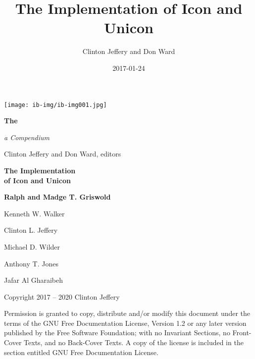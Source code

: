 \documentclass[letterpaper,twoside,12pt]{book}
\title{The Implementation of Icon and Unicon}
\author{Clinton Jeffery and Don Ward}
\date{2017-01-24}
\newcommand*{\TitleFont}{%
      \usefont{T1}{ptm}{b}{n}%
      \fontsize{50}{56}%
      \selectfont}
\begin{document}
\clearpage\clearpage\setcounter{page}{1}\pagestyle{KonvertFolgeii}
\thispagestyle{Konverti}
\begin{center}
\texttt{[image: ib-img/ib-img001.jpg]}
\end{center}
{\color{black}
\bfseries\Huge
The \vspace{0.05in}

\noindent \TitleFont
\begin{center}
\colorbox{blue}{\makebox[6.2in][r]{\parbox{6.2in}{\center\textcolor{white}{Implementation of\\ Icon and Unicon} \vspace{0.05in}}}}
\end{center}
}

\vspace{0.05in}

{\raggedleft\itshape\huge
a Compendium
\par}

\bigskip

{\raggedleft\LARGE
Clinton Jeffery and Don Ward, editors
\par}

\clearpage\setcounter{page}{1}\pagestyle{UnnumberedKonvertFolgeii}
\parbox{1in}{}

\clearpage

\bigskip
\bigskip
\bigskip

{\centering\bfseries\Huge
The Implementation\\
of Icon and Unicon
\par}

\bigskip
\bigskip
\bigskip
\bigskip
\bigskip
\bigskip
\bigskip

{\raggedleft\bfseries\Large
Ralph and Madge T. Griswold
\par
Kenneth W. Walker
\par
Clinton L. Jeffery 
\par
Michael D. Wilder
\par
Anthony T. Jones
\par
Jafar Al Gharaibeh
\par}

\bigskip
\bigskip
\bigskip

\clearpage\setcounter{page}{1}\pagestyle{KonvertFolgeii}
\frontmatter
\bigskip
\bigskip
\noindent Copyright {\textcopyright} 2017 -- 2020 Clinton Jeffery


\noindent Permission is granted to copy, distribute and/or modify this
document under the terms of the GNU Free Documentation License,
Version 1.2 or any later version published by the Free Software
Foundation; with no Invariant Sections, no Front-Cover Texts, and no
Back-Cover Texts. A copy of the license is included in the section
entitled {\textquotedbl}GNU Free Documentation License{\textquotedbl}.
\end{document}
